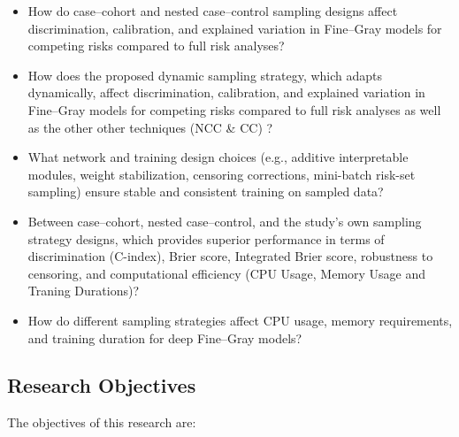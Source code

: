 \documentclass[a4paper,twoside,12pt]{report}
\begin{document}
\begin{itemize}
  \item How do case–cohort and nested case–control sampling designs affect discrimination, calibration, and explained variation in Fine–Gray models for competing risks compared to full risk analyses?
  
  \item  How does the proposed dynamic sampling strategy, which adapts dynamically, affect discrimination, calibration, and explained variation in Fine–Gray models for competing risks compared to full risk analyses as well as the other other techniques (NCC \& CC) ?
  
  \item What network and training design choices (e.g., additive interpretable modules, weight stabilization, censoring corrections, mini-batch risk-set sampling) ensure stable and consistent training on sampled data?
  
  \item  Between case–cohort, nested case–control, and the study's own sampling strategy designs, which provides superior performance in terms of discrimination (C-index), Brier score, Integrated Brier score, robustness to censoring, and computational efficiency (CPU Usage, Memory Usage and Traning Durations)?
  
  \item How do different sampling strategies affect CPU usage, memory requirements, and training duration for deep Fine–Gray models?
\end{itemize}


\subsection{Research Objectives}

The objectives of this research are:
\end{document}
